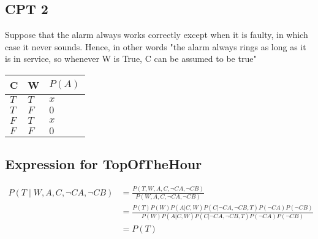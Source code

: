 \documentclass[12pt,a4paper]{article}
\begin{document}
\subsection{CPT 2}
Suppose that the alarm always works correctly except when it is faulty, in which
case it never sounds. Hence, in other words "the alarm always rings as long as it is in service, so whenever W is True, C can be assumed to be true"
\begin{table}[h]
\centering
\begin{tabular}{|l|l|l|}
\hline
C & W  & $P(A)$ \\ \hline
$T$    & $T$     &  $x $         \\ \hline
$T$     & $F$   &    $0$       \\ \hline
$F$    & $T$     &   $x$        \\ \hline
$F$    & $F$    &   $0$         \\ \hline
\end{tabular}
\end{table}

\subsection{Expression for TopOfTheHour}
\begin{equation}
\begin{aligned}
P(T \mid W, A, C, \neg CA, \neg CB) &= \frac{P(T, W, A, C, \neg CA, \neg CB)}{P(W, A, C,  \neg CA, \neg CB)} \\ 
&=  \frac{P(T) P(W) P(A|C,W) P(C| \neg CA, \neg CB, T) P(\neg CA) P(\neg CB)}{ P(W) P(A|C,W) P(C| \neg CA, \neg CB, T) P(\neg CA) P(\neg CB)}  \\
&= P(T)
\end{aligned}
\end{equation}
\end{document}
